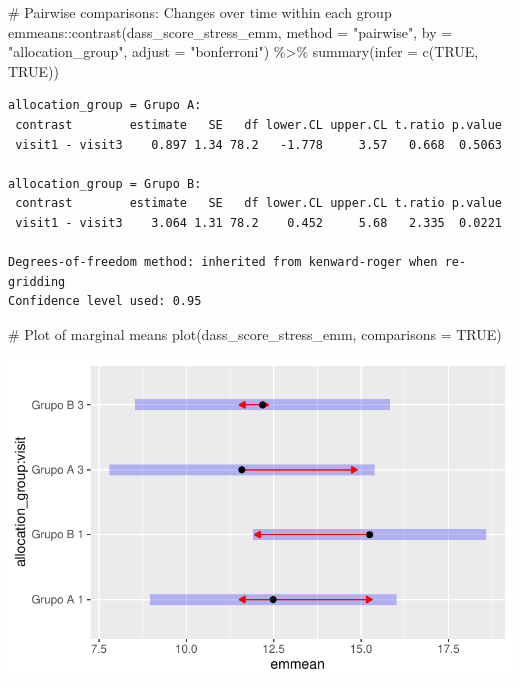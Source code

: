 \documentclass[
  letterpaper,
  DIV=11,
  numbers=noendperiod]{scrartcl}
\newenvironment{Shaded}{\begin{snugshade}}{\end{snugshade}}
\newcommand{\AttributeTok}[1]{\textcolor[rgb]{0.40,0.45,0.13}{#1}}
\newcommand{\CommentTok}[1]{\textcolor[rgb]{0.37,0.37,0.37}{#1}}
\newcommand{\ConstantTok}[1]{\textcolor[rgb]{0.56,0.35,0.01}{#1}}
\newcommand{\FunctionTok}[1]{\textcolor[rgb]{0.28,0.35,0.67}{#1}}
\newcommand{\NormalTok}[1]{\textcolor[rgb]{0.00,0.23,0.31}{#1}}
\newcommand{\SpecialCharTok}[1]{\textcolor[rgb]{0.37,0.37,0.37}{#1}}
\newcommand{\StringTok}[1]{\textcolor[rgb]{0.13,0.47,0.30}{#1}}
\begin{document}
\begin{Shaded}
\begin{Highlighting}[]
\CommentTok{\# Pairwise comparisons: Changes over time within each group}
\NormalTok{emmeans}\SpecialCharTok{::}\FunctionTok{contrast}\NormalTok{(dass\_score\_stress\_emm, }\AttributeTok{method =} \StringTok{"pairwise"}\NormalTok{, }\AttributeTok{by =} \StringTok{"allocation\_group"}\NormalTok{, }\AttributeTok{adjust =} \StringTok{"bonferroni"}\NormalTok{) }\SpecialCharTok{\%\textgreater{}\%} \FunctionTok{summary}\NormalTok{(}\AttributeTok{infer =} \FunctionTok{c}\NormalTok{(}\ConstantTok{TRUE}\NormalTok{, }\ConstantTok{TRUE}\NormalTok{))}
\end{Highlighting}
\end{Shaded}

\begin{verbatim}
allocation_group = Grupo A:
 contrast        estimate   SE   df lower.CL upper.CL t.ratio p.value
 visit1 - visit3    0.897 1.34 78.2   -1.778     3.57   0.668  0.5063

allocation_group = Grupo B:
 contrast        estimate   SE   df lower.CL upper.CL t.ratio p.value
 visit1 - visit3    3.064 1.31 78.2    0.452     5.68   2.335  0.0221

Degrees-of-freedom method: inherited from kenward-roger when re-gridding 
Confidence level used: 0.95 
\end{verbatim}

\begin{Shaded}
\begin{Highlighting}[]
\CommentTok{\# Plot of marginal means}
\FunctionTok{plot}\NormalTok{(dass\_score\_stress\_emm, }\AttributeTok{comparisons =} \ConstantTok{TRUE}\NormalTok{)}
\end{Highlighting}
\end{Shaded}

\includegraphics{Outcomes_V1V2V3_files/figure-pdf/dass_score_stress_sens_emm-1.pdf}
\end{document}
